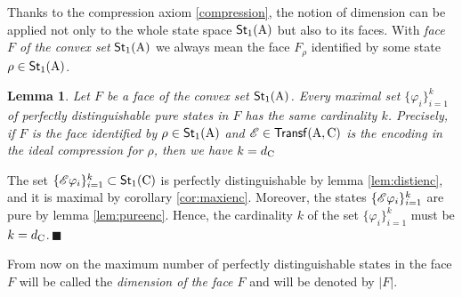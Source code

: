 \documentclass[12pt,aps,pra,showpacs,groupedaddress]{revtex4-1}
\newtheorem{lemma}{Lemma} \newtheorem{proposition}{Proposition}
\def\Proof{\medskip\par\noindent{\bf Proof. }}
\def\qed{$\,\blacksquare$\par}
\def\rC{{\rm C}}
\def\Stset{{\mathsf{St}}}
\def\Trnset{{\mathsf{Transf}}}
\def\SC#1#2{\left(#1\right|\left.\!#2\right)}  \def\Tr{{\rm Tr}}
\begin{document}
 Thanks to the compression axiom \ref{compression}, the notion of dimension can be applied not only
 to the whole state space $\Stset_1 (\rA)$ but also to its faces.  With \emph{face $F$ of the convex
   set} $\Stset_1 (\rA)$ we always mean the face $F_\rho$ identified by some state
 $\rho\in\Stset_1(\rA)$.
  
\begin{lemma}
  Let $F$ be a face of the convex set $\Stset_1 (\rA)$.  Every maximal set $\{\varphi_i\}_{i=1}^k$
  of perfectly distinguishable pure states in $F$ has the same cardinality $k$.  Precisely, if $F$
  is the face identified by $\rho\in\Stset_1 (\rA)$ and $\tE\in\Trnset(\rA, \rC)$ is the encoding in
  the ideal compression for $\rho$, then we have $k = d_\rC$
  \label{lem:cardisuprho}
\end{lemma}

\Proof The set $\{\tE\varphi_i\}_{i=1}^k\subset\Stset_1(\rC)$ is perfectly distinguishable by lemma
\ref{lem:distienc}, and it is maximal by corollary \ref{cor:maxienc}. Moreover, the states
$\{\mathscr E\varphi_i\}_{i=1}^k$ are pure by lemma \ref{lem:pureenc}.  Hence, the cardinality $k$ of the
set $\{\varphi_i\}_{i=1}^k$ must be $k=d_\rC$.\qed
 
From now on the maximum number of perfectly distinguishable states in the face $F$ will be called
the \emph{dimension of the face $F$} and will be denoted by $|F|$.
 
 
\end{document}
